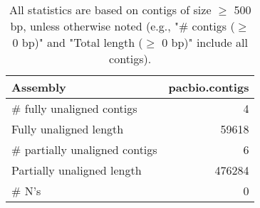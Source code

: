 \documentclass[12pt,a4paper]{article}
\begin{document}
\begin{table}[ht]
\begin{center}
\caption{All statistics are based on contigs of size $\geq$ 500 bp, unless otherwise noted (e.g., "\# contigs ($\geq$ 0 bp)" and "Total length ($\geq$ 0 bp)" include all contigs).}
\begin{tabular}{|l*{1}{|r}|}
\hline
Assembly & pacbio.contigs \\ \hline
\# fully unaligned contigs & 4 \\ \hline
Fully unaligned length & 59618 \\ \hline
\# partially unaligned contigs & 6 \\ \hline
Partially unaligned length & 476284 \\ \hline
\# N's & 0 \\ \hline
\end{tabular}
\end{center}
\end{table}
\end{document}
